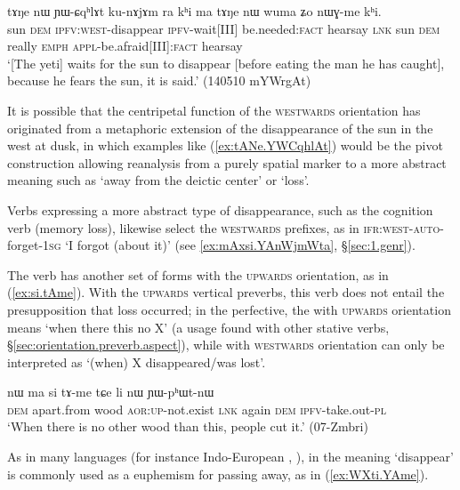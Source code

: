 \begin{exe}
\ex \label{ex:tANe.YWCqhlAt}
\gll  tɤŋe nɯ ɲɯ-ɕqʰlɤt ku-nɤjɤm ra kʰi ma tɤŋe nɯ wuma ʑo nɯɣ-me kʰi.  \\
sun \textsc{dem} \textsc{ipfv}:\textsc{west}-disappear \textsc{ipfv}-wait[III] be.needed:\textsc{fact} hearsay \textsc{lnk} sun \textsc{dem} really \textsc{emph} \textsc{appl}-be.afraid[III]:\textsc{fact} hearsay \\
\glt `[The yeti] waits for the sun to disappear [before eating the man he has caught], because he fears the sun, it is said.' (140510 mYWrgAt)
\end{exe} 

It is possible that the centripetal function of the \textsc{westwards} orientation has originated from a metaphoric extension of the disappearance of the sun in the west at dusk, in which examples like (\ref{ex:tANe.YWCqhlAt}) would be the pivot construction allowing reanalysis from a purely spatial marker to a more abstract meaning such as `away from the deictic center' or `loss'.

Verbs expressing a more abstract type of disappearance, such as the cognition verb  (memory loss), likewise select the \textsc{westwards} prefixes, as in  \textsc{ifr}:\textsc{west}-\textsc{auto}-forget-\textsc{1sg} `I forgot (about it)' (see \ref{ex:mAxsi.YAnWjmWta}, §\ref{sec:1.genr}).

The verb  has another set of forms with the \textsc{upwards} orientation, as in (\ref{ex:si.tAme}). With the \textsc{upwards} vertical preverbs, this verb does not entail the presupposition that loss occurred; in the perfective, the  with \textsc{upwards} orientation means `when there this no X' (a usage found with other stative verbs, §\ref{sec:orientation.preverb.aspect}), while  with \textsc{westwards} orientation can only be interpreted as `(when) X disappeared/was lost'.

 \begin{exe}
\ex \label{ex:si.tAme}
\gll  nɯ ma si tɤ-me tɕe li nɯ ɲɯ-pʰɯt-nɯ\\
\textsc{dem} apart.from wood \textsc{aor}:\textsc{up}-not.exist \textsc{lnk} again \textsc{dem} \textsc{ipfv}-take.out-\textsc{pl}\\
\glt `When there is no other wood than this, people cut it.' (07-Zmbri)
\end{exe} 

As in many languages (for instance Indo-European , \citealt[439--440]{liv}),  in the meaning `disappear' is commonly used as a euphemism for passing away, as in (\ref{ex:WXti.YAme}).

